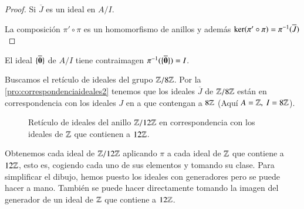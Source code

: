 \begin{proof}
	Si $\overline{J}$ es un ideal en $A/I$.
	
	\begin{figure}[h]
		\centering
	\end{figure}
	La composición $\pi' \circ \pi$ es un homomorfismo de anillos y además $\ker (\pi' \circ \pi) = \pi^{-1}(\overline{J})$
\end{proof}

\begin{obs}
	El ideal $\{\overline{\mathbf{0}}\}$ de $A/I$ tiene contraimagen $\pi^{-1}(\{\overline{\mathbf{0}}\}) = I$.
\end{obs}

\begin{ej}
	Buscamos el retículo de ideales del grupo $\mathbb{Z}/8\mathbb{Z}$. Por la \autoref{pro:correspondenciaideales2} tenemos que los ideales $\overline{J}$ de $\mathbb{Z}/8\mathbb{Z}$ están en correspondencia con los ideales $J$ en a que contengan a $8\mathbb{Z}$ (Aquí $A = \mathbb{Z},\ I = 8\mathbb{Z}$).
	
	\begin{figure}[h]
		\centering
		\caption{Retículo de ideales del anillo $\mathbb{Z}/12\mathbb{Z}$ en correspondencia con los ideales de $\mathbb{Z}$ que contienen a $12\mathbb{Z}$.}
	\end{figure}

	Obtenemos cada ideal de $\mathbb{Z}/12\mathbb{Z}$ aplicando $\pi$ a cada ideal de $\mathbb{Z}$ que contiene a $12\mathbb{Z}$, esto es, cogiendo cada uno de sus elementos y tomando su clase. Para simplificar el dibujo, hemos puesto los ideales con generadores pero se puede hacer a mano. También se puede hacer directamente tomando la imagen del generador de un ideal de $\mathbb{Z}$ que contiene a $12\mathbb{Z}$.
\end{ej}



